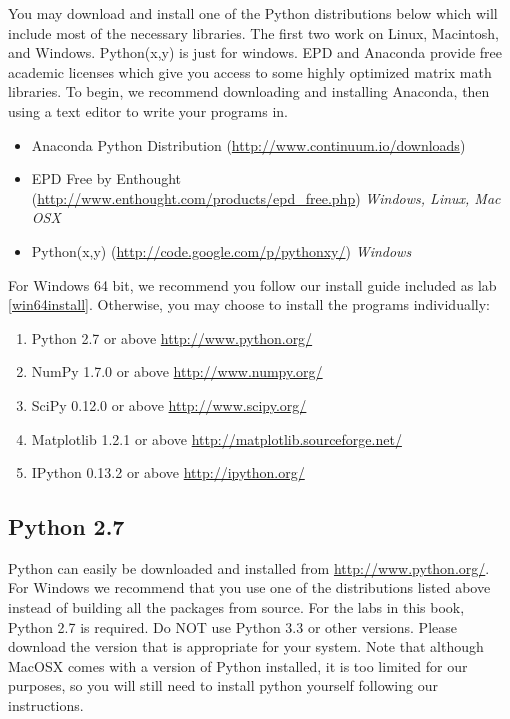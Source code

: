 \label{pythoninstall}


You may download and install one of the Python distributions below which will 
include most of the necessary libraries.
The first two work on Linux, Macintosh, and Windows.
Python(x,y) is just for windows.
EPD and Anaconda provide free academic licenses which give you access to some highly
optimized matrix math libraries.
To begin, we recommend downloading and installing Anaconda, then using 
a text editor to write your programs in. 
\begin{itemize}
\item Anaconda Python Distribution (\url{http://www.continuum.io/downloads})
\item EPD Free by Enthought (\url{http://www.enthought.com/products/epd_free.php})
        \emph{Windows, Linux, Mac OSX}
\item Python(x,y) (\url{http://code.google.com/p/pythonxy/}) \emph{Windows}
\end{itemize}
For Windows 64 bit, we recommend you follow our install guide included as lab
\ref{win64install}. Otherwise, you may choose to install the programs individually:
\begin{enumerate}
\item Python 2.7 or above \url{http://www.python.org/}
\item NumPy 1.7.0 or above \url{http://www.numpy.org/}
\item SciPy 0.12.0 or above \url{http://www.scipy.org/}
\item Matplotlib 1.2.1 or above \url{http://matplotlib.sourceforge.net/}
\item IPython 0.13.2 or above \url{http://ipython.org/}
\end{enumerate}

\subsection*{Python 2.7}
Python can easily be downloaded and installed from \url{http://www.python.org/}.
For Windows we recommend that you use one of the distributions listed above
instead of building all the packages from source.
For the labs in this book, Python 2.7 is required.
Do NOT use Python 3.3 or other versions.
Please download the version that is appropriate for your system.
Note that although MacOSX comes with a version of Python installed, it is
too limited for our purposes, so you will still need to install python yourself
following our instructions.

